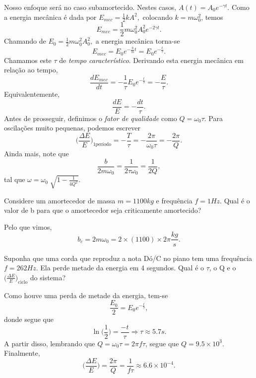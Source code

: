 \documentclass[PhysicsII/physicsII_notes.tex]{subfiles}
\begin{document}
Nosso enfoque será no caso subamortecido. Nestes casos, \(A(t) = A_{0}e^{-\gamma t}.\) Como
a energia mecânica é dada por \(E_{mec} = \frac{1}{2}kA^{2},\) colocando \(k=m\omega_{0}^{2}\), temos
\[
	E_{mec} = \frac{1}{2}m\omega_{0}^{2}A_{0}^{2}e^{-2\gamma t}.
\]
Chamando de \(E_{0} = \frac{1}{2}m\omega_{0}^{2}A_{0}^{2},\) a energia mecânica torna-se
\[
	E_{mec} = E_{0}e^{-\frac{b}{m}t} = E_{0}e^{-\frac{t}{\tau }}.
\]
Chamamos este \(\tau \) de \textit{tempo característico}. Derivando esta energia mecânica em relação ao tempo,
\[
	\frac{dE_{mec}}{dt} = -\frac{1}{\tau }E_{0} e^{-\frac{t}{\tau }} = -\frac{E}{\tau }.
\]
Equivalentemente,
\[
	\frac{dE}{E} = -\frac{dt}{\tau }.
\]
Antes de prosseguir, definimos o \textit{fator de qualidade} como \(Q = \omega_{0}\tau \). Para
oscilações muito pequenas, podemos escrever
\[
	\biggl(\frac{\Delta E}{E}\biggr)_{1\text{período}} = -\frac{T}{\tau } = -\frac{2\pi }{\omega_{0}\tau } = -\frac{2\pi }{Q}.
\]
Ainda mais, note que
\[
	\frac{b}{2m\omega_{0}} = \frac{1}{2\tau \omega_{0}} = \frac{1}{2Q},
\]
tal que \(\omega = \omega_{0}\sqrt[]{1 - \frac{1}{4Q^{2}}}\).
\begin{example}
	Considere um amortecedor de massa \(m=1100kg\) e frequência \(f = 1Hz\). Qual é o valor de b para que o amortecedor
	seja criticamente amortecido?

	Pelo que vimos,
	\[
		b_{c} = 2m\omega_{0} = 2\times(1100)\times 2\pi \frac{kg}{s}.
	\]
\end{example}
\begin{example}
	Suponha que uma corda que reproduz a nota Dó/C no piano tem uma frequência \(f = 262Hz\). Ela perde metade
	da energia em 4 segundos. Qual é o \(\tau \), o Q e o \(\biggl(\frac{\Delta E}{E}\biggr)_{\text{ciclo}}\) do sistema?

	Como houve uma perda de metade da energia, tem-se
	\[
		\frac{E_{0}}{2} = E_{0}e^{-\frac{t}{\tau }},
	\]
	donde segue que
	\[
		\ln \biggl(\frac{1}{2}\biggr) = \frac{-t}{\tau } \Rightarrow \tau \approx 5.7s.
	\]
	A partir disso, lembrando que \(Q = \omega_{0}\tau  = 2\pi f \tau \), segue que \(Q = 9.5\times 10^{3}.\) Finalmente,
	\[
		\biggl(\frac{\Delta E}{E}\biggr) = \frac{2\pi }{Q} = \frac{1}{f\tau }\approx 6.6\times 10^{-4}.
	\]
\end{example}
\end{document}

